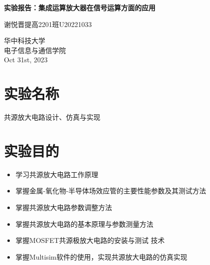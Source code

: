 \documentclass[a4paper,11pt,UTF8]{article}
\numberwithin{equation}{subsection}
\begin{document}
\begin{titlepage}
	\begin{center}
		\vspace*{1cm}
		\textbf{\LARGE 实验报告：集成运算放大器在信号运算方面的应用}
		\vspace{0.5cm}
		
		\Large 谢悦晋\quad 提高2201班\quad U20221033
		\vspace{1cm}
		\begin{figure}[H]
			\centering
			\caption*{}
		\end{figure}
		\vfill
		\vspace{0.8cm}
		华中科技大学 \\
		电子信息与通信学院 \\
		Oct 31st, 2023
	\end{center}
\end{titlepage}
\tableofcontents\newpage
\section{实验名称}
共源放大电路设计、仿真与实现
\section{实验目的}
\begin{itemize}
	\item 学习共源放大电路工作原理
	\item 掌握金属-氧化物-半导体场效应管的主要性能参数及其测试方法
	\item 掌握共源放大电路参数调整方法
	\item 掌握共源放大电路的基本原理与参数测量方法
	\item 掌握MOSFET共源极放大电路的安装与测试 技术
	\item 掌握Multisim软件的使用，实现共源放大电路的仿真实现
\end{itemize}
\end{document}
